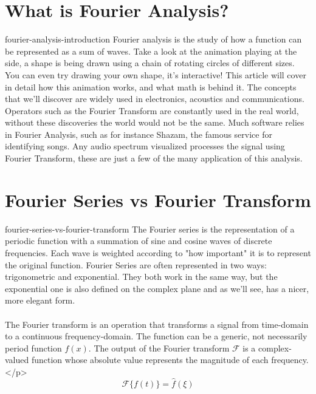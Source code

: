 \documentclass[preview]{standalone}
\begin{document}
\genpage

\section{What is Fourier Analysis?}

\begin{snippet}{fourier-analysis-introduction}
    Fourier analysis is the study of how a function can be represented as a sum of waves. Take a look at the animation playing at the side, a shape is being drawn using a chain of rotating circles of different sizes. You can even try drawing your own shape, it's interactive! This article will cover in detail how this animation works, and what math is behind it. The concepts that we'll discover are widely used in electronics, acoustics and communications. Operators such as the Fourier Transform are constantly used in the real world, without these discoveries the world would not be the same. Much software relies in Fourier Analysis, such as for instance Shazam, the famous service for identifying songs. Any audio spectrum visualized processes the signal using Fourier Transform, these are just a few of the many application of this analysis.
\end{snippet}


\section{Fourier Series vs Fourier Transform}

\begin{snippet}{fourier-series-vs-fourier-transform}
    The Fourier series is the representation of a periodic function
    with a summation of sine and cosine waves of discrete frequencies. Each wave is weighted
    according to "how important" it is to represent the original function.
    Fourier Series are often represented in two ways: trigonometric and exponential.
    They both work in the same way, but the exponential one is also defined on the
    complex plane and as we'll see, has a nicer, more elegant form.
    \\\\
    The Fourier transform is an operation that transforms a signal
    from time-domain to a continuous frequency-domain. The function can be a generic, not necessarily period function \(f(x)\).
    The output of the Fourier transform \(\mathcal{F}\) is a complex-valued function whose absolute value represents the magnitude of each frequency.</p>
    \[
        \mathcal{F}\{f(t)\}=\hat{f}(\xi)
    \]
\end{snippet}
\end{document}
